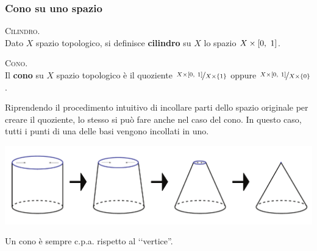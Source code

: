 \subsubsection{Cono su uno spazio}
\begin{define}\textsc{Cilindro.}\\
	Dato $X$ spazio topologico, si definisce \textbf{cilindro} su $X$ lo spazio $X\times \left[0,\ 1\right]$.
\end{define}
\begin{define}\textsc{Cono.}\\
	Il \textbf{cono} su $X$ spazio topologico è il quoziente $\displaystyle \nicefrac{X\times\left[0,\ 1\right]}{X\times\{1\}}$ oppure $\displaystyle \nicefrac{X\times\left[0,\ 1\right]}{X\times\{0\}}$.
\end{define}
\begin{intuit}
	Riprendendo il procedimento intuitivo di incollare parti dello spazio originale per creare il quoziente, lo stesso si può fare anche nel caso del cono. In questo caso, tutti i punti di una delle basi vengono incollati in uno.
\begin{center}
	\includegraphics[trim=0cm 0cm 0cm 0cm,clip,scale=0.4]{images/cilindertocone.pdf}
\end{center}
\end{intuit}
\begin{observe}
	Un cono è sempre c.p.a. rispetto al ‘‘vertice''.
\end{observe}
